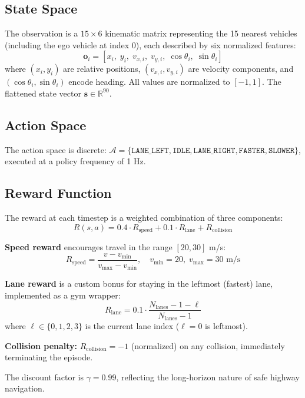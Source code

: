 \documentclass[conference]{IEEEtran}
\begin{document}
\subsection{State Space}

The observation is a $15 \times 6$ kinematic matrix representing the 15 nearest vehicles
(including the ego vehicle at index 0), each described by six normalized features:
\[
  \mathbf{o}_i = [x_i,\; y_i,\; v_{x,i},\; v_{y,i},\; \cos\theta_i,\; \sin\theta_i]
\]
where $(x_i, y_i)$ are relative positions, $(v_{x,i}, v_{y,i})$ are velocity components,
and $(\cos\theta_i, \sin\theta_i)$ encode heading. All values are normalized to $[-1, 1]$.
The flattened state vector $\mathbf{s} \in \mathbb{R}^{90}$.

\subsection{Action Space}

The action space is discrete: $\mathcal{A} = \{\texttt{LANE\_LEFT}, \texttt{IDLE},
\texttt{LANE\_RIGHT}, \texttt{FASTER}, \texttt{SLOWER}\}$, executed at a policy
frequency of 1 Hz.

\subsection{Reward Function}

The reward at each timestep is a weighted combination of three components:
\begin{equation}
  R(s,a) = 0.4 \cdot R_{\text{speed}} + 0.1 \cdot R_{\text{lane}} + R_{\text{collision}}
  \label{eq:reward}
\end{equation}

\noindent\textbf{Speed reward} encourages travel in the range $[20, 30]$ m/s:
\[
  R_{\text{speed}} = \frac{v - v_{\min}}{v_{\max} - v_{\min}}, \quad
  v_{\min}=20,\; v_{\max}=30 \text{ m/s}
\]

\noindent\textbf{Lane reward} is a custom bonus for staying in the leftmost (fastest)
lane, implemented as a gym wrapper:
\[
  R_{\text{lane}} = 0.1 \cdot \frac{N_{\text{lanes}} - 1 - \ell}{N_{\text{lanes}} - 1}
\]
where $\ell \in \{0, 1, 2, 3\}$ is the current lane index ($\ell{=}0$ is leftmost).

\noindent\textbf{Collision penalty:} $R_{\text{collision}} = -1$ (normalized) on
any collision, immediately terminating the episode.

The discount factor is $\gamma = 0.99$, reflecting the long-horizon nature of
safe highway navigation.
\end{document}
